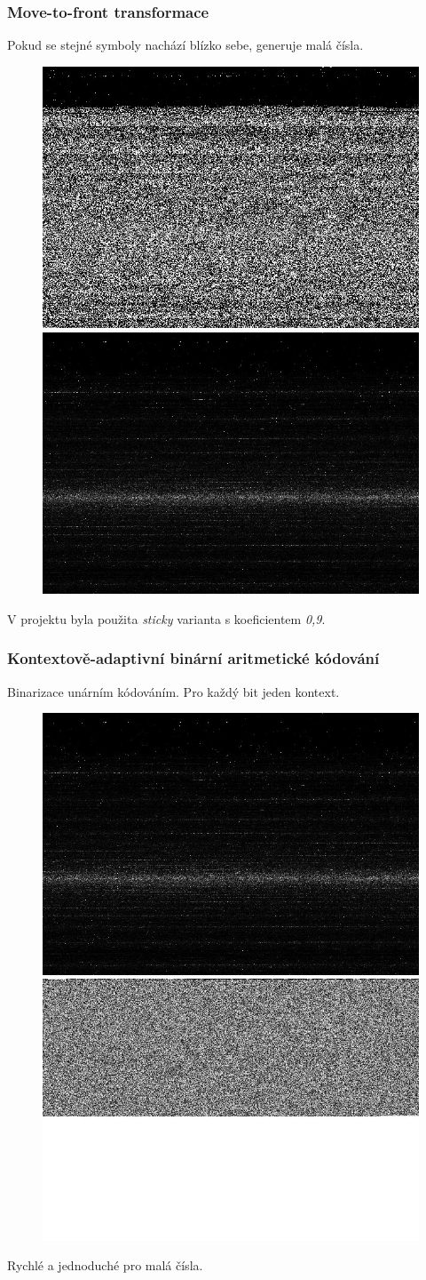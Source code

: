 \documentclass{beamer}
\begin{document}
\begin{frame}
  \center
  \frametitle{Move-to-front transformace}
  Pokud se stejné symboly nachází blízko sebe, generuje malá čísla.\\[1em]
  \begin{figure}
  \includegraphics[width=.4\textwidth]{friends_bwt.jpg}
  \includegraphics[width=.4\textwidth]{friends_mtf.jpg}
  \end{figure}
  V projektu byla použita \textit{sticky} varianta s koeficientem \textit{0,9}.
\end{frame}

\begin{frame}
  \center
  \frametitle{Kontextově-adaptivní binární aritmetické kódování}
  Binarizace unárním kódováním. Pro každý bit jeden kontext.\\[1em]
  \begin{figure}
  \includegraphics[width=.4\textwidth]{friends_mtf.jpg}
  \includegraphics[width=.4\textwidth]{friends_cabac.jpg}
  \end{figure}
  Rychlé a jednoduché pro malá čísla.
\end{frame}
\end{document}
